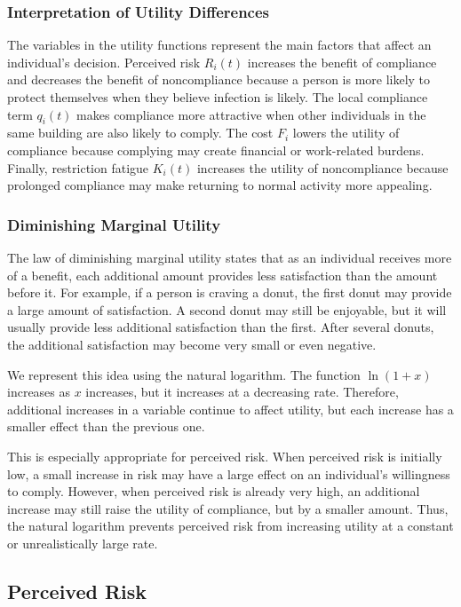 \documentclass[11pt]{article}
\theoremstyle{definition}
\theoremstyle{plain}
\begin{document}
\subsubsection{Interpretation of Utility Differences}

The variables in the utility functions represent the main factors that affect an individual's decision. Perceived risk $R_i(t)$ increases the benefit of compliance and decreases the benefit of noncompliance because a person is more likely to protect themselves when they believe infection is likely. The local compliance term $q_i(t)$ makes compliance more attractive when other individuals in the same building are also likely to comply. The cost $F_i$ lowers the utility of compliance because complying may create financial or work-related burdens. Finally, restriction fatigue $K_i(t)$ increases the utility of noncompliance because prolonged compliance may make returning to normal activity more appealing.

\subsubsection{Diminishing Marginal Utility}

The law of diminishing marginal utility states that as an individual receives more of a benefit, each additional amount provides less satisfaction than the amount before it. For example, if a person is craving a donut, the first donut may provide a large amount of satisfaction. A second donut may still be enjoyable, but it will usually provide less additional satisfaction than the first. After several donuts, the additional satisfaction may become very small or even negative.

We represent this idea using the natural logarithm. The function $\ln(1+x)$ increases as $x$ increases, but it increases at a decreasing rate. Therefore, additional increases in a variable continue to affect utility, but each increase has a smaller effect than the previous one.

This is especially appropriate for perceived risk. When perceived risk is initially low, a small increase in risk may have a large effect on an individual's willingness to comply. However, when perceived risk is already very high, an additional increase may still raise the utility of compliance, but by a smaller amount. Thus, the natural logarithm prevents perceived risk from increasing utility at a constant or unrealistically large rate.


\subsection{Perceived Risk}
\label{sec:risk}
\end{document}
